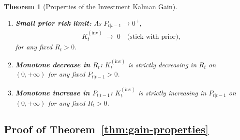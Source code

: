 \documentclass[12pt,openany]{book}
\numberwithin{equation}{chapter}
\theoremstyle{plain}
\newtheorem{theorem}{Theorem}[chapter]
\theoremstyle{definition}
\theoremstyle{remark}
\begin{document}
\begin{theorem}[Properties of the Investment Kalman Gain]
\begin{enumerate}
  \item \textbf{Small prior risk limit:}
        As $P_{t|t-1} \to 0^{+}$,
        \begin{align}
          K_t^{(\mathrm{inv})} \;\to\; 0
          \quad \text{(stick with prior)},
          \label{eq:gain-limit-small-P}
        \end{align}
        for any fixed $R_t > 0$.

  \item \textbf{Monotone decrease in $R_t$:}
        $K_t^{(\mathrm{inv})}$ is strictly decreasing in
        $R_t$ on $(0, +\infty)$ for any fixed
        $P_{t|t-1} > 0$.

  \item \textbf{Monotone increase in $P_{t|t-1}$:}
        $K_t^{(\mathrm{inv})}$ is strictly increasing in
        $P_{t|t-1}$ on $(0, +\infty)$ for any fixed
        $R_t > 0$.
\end{enumerate}
\end{theorem}

\subsection{Proof of Theorem~\ref{thm:gain-properties}}
\end{document}
